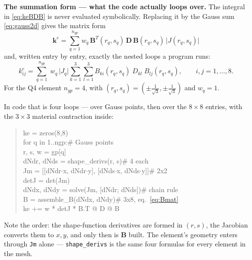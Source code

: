 \documentclass[11pt]{article}
\begin{document}
\medskip
\noindent
\textbf{The summation form --- what the code actually loops over.} The
integral in \eqref{eq:keBDB} is never evaluated symbolically. Replacing it by
the Gauss sum \eqref{eq:gauss2d} gives the matrix form
\begin{equation}\label{eq:kesum}
  \boxed{\;
  \bm{k}^{e}=\sum_{q=1}^{n_{gp}} w_{q}\,
     \bm{B}^{T}(r_{q},s_{q})\,\bm{D}\,\bm{B}(r_{q},s_{q})\,
     \bigl|J(r_{q},s_{q})\bigr|\;}
\end{equation}
and, written entry by entry, exactly the nested loops a program runs:
\begin{equation}\label{eq:kesumij}
  k^{e}_{ij}=\sum_{q=1}^{n_{gp}}\;w_{q}\,\bigl|J_{q}\bigr|
     \sum_{k=1}^{3}\sum_{l=1}^{3}
     B_{ki}(r_{q},s_{q})\;D_{kl}\;B_{lj}(r_{q},s_{q}),
  \qquad i,j=1,\dots,8 .
\end{equation}
For the Q4 element $n_{gp}=4$, with
$(r_{q},s_{q})=(\pm\tfrac{1}{\sqrt3},\pm\tfrac{1}{\sqrt3})$ and $w_{q}=1$.

\medskip
\noindent
In code that is four loops --- over Gauss points, then over the $8\times8$
entries, with the $3\times3$ material contraction inside:

\begin{quote}\ttfamily\small
ke = zeros(8,8)\\
for q in 1..ngp:\qquad\textrm{\# Gauss points}\\
\hspace*{1.2em}r, s, w = gp[q]\\
\hspace*{1.2em}dNdr, dNds = shape\_derivs(r, s)\qquad\textrm{\# 4 each}\\
\hspace*{1.2em}Jm = [[dNdr$\cdot$x, dNdr$\cdot$y], [dNds$\cdot$x, dNds$\cdot$y]]\qquad\textrm{\# 2x2}\\
\hspace*{1.2em}detJ = det(Jm)\\
\hspace*{1.2em}dNdx, dNdy = solve(Jm, [dNdr; dNds])\qquad\textrm{\# chain rule}\\
\hspace*{1.2em}B = assemble\_B(dNdx, dNdy)\qquad\textrm{\# 3x8, eq.\ \ref{eq:Bmat}}\\
\hspace*{1.2em}ke += w * detJ * B.T @ D @ B
\end{quote}

\noindent
Note the order: the shape-function derivatives are formed in $(r,s)$, the
Jacobian converts them to $x,y$, and only then is $\bm{B}$ built. The element's
geometry enters through \texttt{Jm} alone --- \texttt{shape\_derivs} is the
same four formulas for every element in the mesh.
\end{document}
